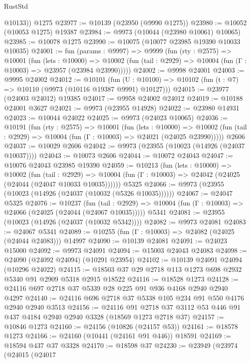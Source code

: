 \begin{lexlean}{RustStd}
\begin{coremodule}
        @10133))
    @1275
@23977 := @10139 (@23950 (@9990 @1275))
@23980 := @10052 (@10053 @1275) @19387
@23984 := @9973 (@10044 (@23980 @10061) @10065)
@23985 := @10078 @1275
@23990 := @10075 (@10077 @23985 @19390 @10033 @10035)
@24001 := fun (params : @9997) =>
  @9999
    (fun (rty : @2575) =>
    @10001
      (fun (lets : @10000) =>
      @10002 (fun (tail : @2929) => @10004 (fun (Γ : @10003) => @23957 (@23984 @23990)))))
@24002 := @9998 @24001
@24003 := @9995 @24002
@24012 := @10101
    (fun (U : @10100) => @10102 (fun (t : @7) => @10110 (@9973 (@10116 @19387 @9991) @10127)))
@24015 := @23977 (@24003 @24012) @19385
@24017 := @9958 @24002 @24012
@24019 := @10188 @24001 @3627
@24021 := @9973 (@23955 @14928)
@24022 := @23980 @14931
@24023 := @10044 @24022
@24025 := @9973 (@24023 @10065)
@24036 := @10191
    (fun (rty : @2575) =>
    @10001
      (fun (lets : @10000) =>
      @10002 (fun (tail : @2929) => @10004 (fun (Γ : @10003) => @24021 (@24025 @23990)))))
    @2606
@24037 := @10029 @2606
@24042 := @9973 (@23955 (@10023 (@14926 (@24037 @10037))))
@24043 := @10073 @2606
@24044 := @10072 @24043
@24047 := @10076 @24043 @23985 @19390
@24059 := @10213
    (fun (lets : @10000) =>
    @10002
      (fun (tail : @2929) =>
      @10004 (fun (Γ : @10003) => @24042 (@24025 (@24044 (@24047 @10033 @10035))))))
    @5325
@24066 := @9973 (@23955 (@10023 (@14926 (@24037 (@10032 (@5326 @10035))))))
@24067 := @24047 @5325
@24076 := @10237
    (fun (tail : @2929) => @10004 (fun (Γ : @10003) => @24066 (@24025 (@24044 (@24067 @10035)))))
    @5341
@24081 := @23955 (@10023 (@14926 (@24037 (@10032 @5342))))
@24082 := @9973 @24081
@24083 := @24067 @5341
@24089 := @10255 (fun (Γ : @10003) => @24082 (@24025 (@24044 @24083))) @14997
@24090 := @10139 @24081
@24091 := @24023 @15000
@24092 := @9973 @24091
@24094 := @15003 @24043 @24083
@24098 := @24090 (@24092 @24094) (@10291 @23954)
@24102 := @10139 @24091 @24094 (@10296 @24022)
@24115 := @18503 @37 @29 @2718 @113 @1273 @698 @2932 @5340 @91 @2909 @5318 @2915 @18522
@24116 := @18528 @1273
@24128 := @24116 @697 @2718 @37 @5339 @28 @225 @91 @936 @4168 @2940 @2940 @4297
@24140 := @24116 @696 @2718 @37 @5338 @105 @234 @91 @550 @4176 @2940 @2940 @3513
@24156 := @24116
    @91
    @2718
    @37
    @3112
    @53
    @446
    @91
    @437
    @4184
    @2940
    @2940
    @3328
    (@18569 @1273 @2718 @37)
@24157 := @10846 @1273
@24160 := @24156 (@10826 (@24157 @53))
@24161 := @18578 @1273
@24166 := @24160 (@10441 (@24161 @91 @446)) @18591
@24169 := @18594 @437 @37 @3328
@24170 := @18598 @37
@24230 := @23949
    (@23974
      (@24015
        (@24017

\end{coremodule}
\end{lexlean}
